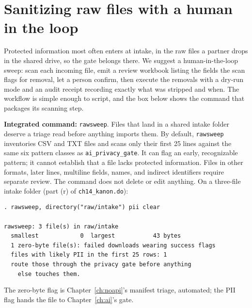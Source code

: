 \section{Sanitizing raw files with a human in the loop}\label{sec:rawsweep}
Protected information most often enters at intake, in the raw files a partner drops in the shared drive, so the gate belongs there. We suggest a human-in-the-loop sweep: scan each incoming file, emit a review workbook listing the fields the scan flags for removal, let a person confirm, then execute the removals with a dry-run mode and an audit receipt recording exactly what was stripped and when. The workflow is simple enough to script, and the box below shows the command that packages its scanning step.

\begin{kaobox}[frametitle=Package Integration: \texttt{rawsweep}]
\textbf{Integrated command:} \texttt{rawsweep}. Files that land in a shared intake folder deserve a triage read before anything imports them. By default, \texttt{rawsweep} inventories CSV and TXT files and scans only their first 25 lines against the same six pattern classes as \texttt{ai\_privacy\_gate}. It can flag an early, recognizable pattern; it cannot establish that a file lacks protected information. Files in other formats, later lines, multiline fields, names, and indirect identifiers require separate review. The command does not delete or edit anything. On a three-file intake folder (part (r) of \texttt{ch14\_kanon.do}):
\par
{\footnotesize
\begin{verbatim}
. rawsweep, directory("raw/intake") pii clear

rawsweep: 3 file(s) in raw/intake
  smallest            0  largest           43 bytes
  1 zero-byte file(s): failed downloads wearing success flags
  files with likely PII in the first 25 rows: 1
  route those through the privacy gate before anything
    else touches them.
\end{verbatim}
}
The zero-byte flag is Chapter~\ref{ch:noapi}'s manifest triage, automated; the PII flag hands the file to Chapter~\ref{ch:ai}'s gate.
\end{kaobox}

